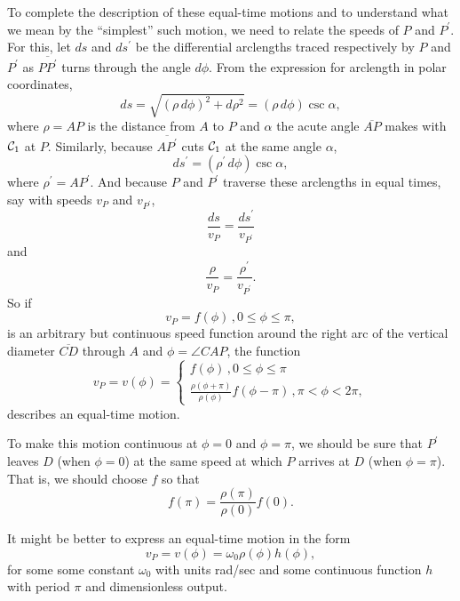 \documentclass{ximera}
\begin{document}
To complete the description of these equal-time motions and to understand what we mean by the ``simplest'' such motion, we need to relate the speeds of $P$ and $P^\prime$. For this, let $ds$ and $ds^\prime$ be the differential arclengths  traced respectively by $P$ and $P^\prime$ as $\overline{PP^\prime}$ turns through the angle $d\phi$. From the expression for arclength in polar coordinates,  
\begin{equation}
   ds =  \sqrt{(\rho \, d\phi)^2 + d\rho^2}   =   (\rho \, d\phi) \csc \alpha ,   \label{Eq:ArcLength}
\end{equation}
where $\rho = AP$ is the distance from $A$ to $P$ and $\alpha$ the acute angle $\overline{AP}$ makes with ${\cal C}_1$ at $P$. Similarly, because $\overline{AP^\prime}$ cuts ${\cal C}_1$ at the same angle $\alpha$,
\begin{equation}
   ds^\prime =   (\rho^\prime \, d\phi) \csc \alpha ,  \label{Eq:ArcLength2}
\end{equation}
where $\rho^\prime = AP^\prime$. And because $P$ and $P^\prime$ traverse these arclengths in equal times, say with speeds $v_P$ and $v_{P^\prime}$, 
\[
   \frac{ds}{v_P} = \frac{ds^\prime}{v_{P^\prime}}
\] 
and
\begin{equation}
    \frac{\rho}{v_P} = \frac{\rho^\prime}{v_{P^\prime}} .  \label{Eq:SpeedCondition}
\end{equation}
So if 
\[
  v_P = f(\phi) \, , 0\leq \phi \leq \pi , 
\]
is an arbitrary but continuous speed function around the right arc of the vertical diameter $\overline{CD}$  through $A$ and $\phi = \angle CAP$, the function
\[
   v_P = v(\phi)  = 
\begin{cases}
          f(\phi) \, , 0\leq \phi \leq \pi \\
         \frac{\rho (\phi + \pi)}{\rho (\phi)} f(\phi-\pi) \, , \pi < \phi < 2\pi ,
\end{cases}
\]
describes an equal-time motion. %

To make this motion continuous at $\phi=0$ and $\phi= \pi$, we should be sure that $P^\prime$ leaves $D$ (when $\phi=0$) at the same speed at which $P$ arrives at $D$ (when $\phi = \pi$). That is, we should choose $f$ so that 
\[
   f(\pi) =  \frac{\rho(\pi)}{\rho(0)} f(0) .
\]


It might be better to express an equal-time motion in the form
\[
      v_P = v(\phi) = \omega_0 \rho (\phi) h(\phi) ,
\]
for some some constant $\omega_0$ with units rad/sec and some continuous function $h$ with period $\pi$ and dimensionless output.
\end{document}
